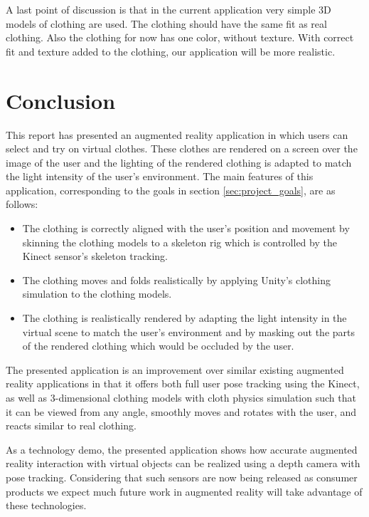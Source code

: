 \documentclass[twocolumn,a4paper]{article}
\begin{document}
A last point of discussion is that in the current application very simple 3D models of clothing are used. The clothing should have the same fit as real clothing. Also the clothing for now has one color, without texture. With correct fit and texture added to the clothing, our application will be more realistic.

\section{Conclusion}
\label{sec:conclusion}

This report has presented an augmented reality application in which users can select and try on virtual clothes. These clothes are rendered on a screen over the image of the user and the lighting of the rendered clothing is adapted to match the light intensity of the user's environment. The main features of this application, corresponding to the goals in section \ref{sec:project_goals}, are as follows:
\begin{itemize}
\item The clothing is correctly aligned with the user's position and movement by skinning the clothing models to a skeleton rig which is controlled by the Kinect sensor's skeleton tracking.
\item The clothing moves and folds realistically by applying Unity's clothing simulation to the clothing models.
\item The clothing is realistically rendered by adapting the light intensity in the virtual scene to match the user's environment and by masking out the parts of the rendered clothing which would be occluded by the user.
\end{itemize}

The presented application is an improvement over similar existing augmented reality applications in that it offers both full user pose tracking using the Kinect, as well as 3-dimensional clothing models with cloth physics simulation such that it can be viewed from any angle, smoothly moves and rotates with the user, and reacts similar to real clothing.

As a technology demo, the presented application shows how accurate augmented reality interaction with virtual objects can be realized using a depth camera with pose tracking. Considering that such sensors are now being released as consumer products we expect much future work in augmented reality will take advantage of these technologies.
\end{document}
